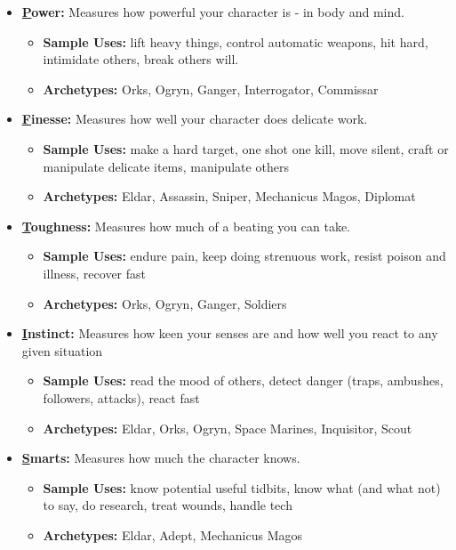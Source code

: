 	\begin{itemize}
		\item {\large\textbf{\underline{P}ower:}} Measures how powerful your character is - in body and mind.
		\begin{itemize}
			\item \textbf{Sample Uses:} lift heavy things, control automatic weapons, hit hard, intimidate others, break others will.
			\item \textbf{Archetypes:} Orks, Ogryn, Ganger, Interrogator, Commissar
		\end{itemize}

		\item {\large\textbf{\underline{F}inesse:}} Measures how well your character does delicate work.
		\begin{itemize}
			\item \textbf{Sample Uses:} make a hard target, one shot one kill, move silent, craft or manipulate delicate items, manipulate others
			\item \textbf{Archetypes:} Eldar, Assassin, Sniper, Mechanicus Magos, Diplomat
		\end{itemize}

		\item {\large\textbf{\underline{T}oughness:}} Measures how much of a beating you can take.
		\begin{itemize}
			\item \textbf{Sample Uses:} endure pain, keep doing strenuous work, resist poison and illness, recover fast
			\item \textbf{Archetypes:} Orks, Ogryn, Ganger, Soldiers
		\end{itemize}

		\item {\large\textbf{\underline{I}nstinct:}} Measures how keen your senses are and how well you react to any given situation
		\begin{itemize}
			\item \textbf{Sample Uses:} read the mood of others, detect danger (traps, ambushes, followers, attacks), react fast
			\item \textbf{Archetypes:} Eldar, Orks, Ogryn, Space Marines, Inquisitor, Scout
		\end{itemize}

		\item {\large\textbf{\underline{S}marts:}} Measures how much the character knows.
		\begin{itemize}
			\item \textbf{Sample Uses:} know potential useful tidbits, know what (and what not) to say, do research, treat wounds, handle tech
			\item \textbf{Archetypes:} Eldar, Adept, Mechanicus Magos
		\end{itemize}


\end{itemize}

